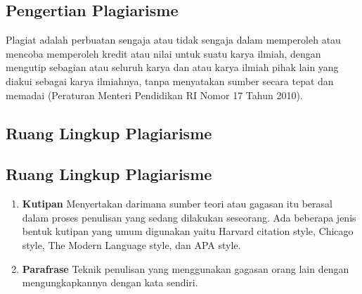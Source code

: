 \subsection{Pengertian Plagiarisme}
Plagiat adalah perbuatan sengaja atau tidak sengaja dalam memperoleh atau mencoba memperoleh kredit atau nilai untuk suatu karya ilmiah, dengan mengutip sebagian atau seluruh karya dan atau karya ilmiah pihak lain yang diakui sebagai karya ilmiahnya, tanpa menyatakan sumber secara tepat dan memadai (Peraturan Menteri Pendidikan RI Nomor 17 Tahun 2010).

\subsection{Ruang Lingkup Plagiarisme}

\subsection{Ruang Lingkup Plagiarisme}
\begin{enumerate}
    \item \textbf{Kutipan} 
     \newline Menyertakan darimana sumber teori atau gagasan itu berasal dalam proses penulisan yang sedang dilakukan seseorang. Ada beberapa jenis bentuk kutipan yang umum digunakan yaitu Harvard citation style, Chicago style, The Modern Language style, dan APA style.
     \item \textbf{Parafrase}
     \newline Teknik penulisan yang menggunakan gagasan orang lain dengan mengungkapkannya dengan
kata sendiri.
\end{enumerate}

